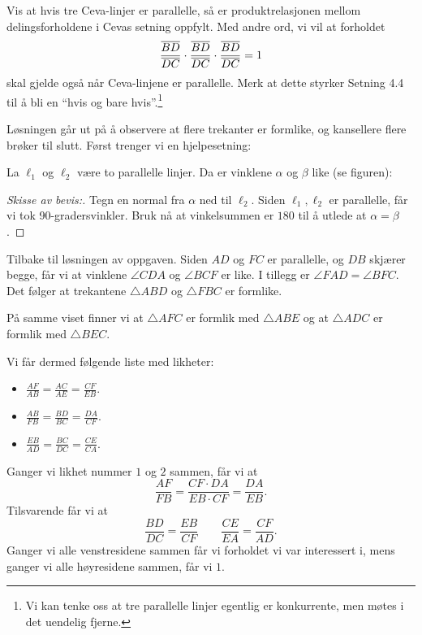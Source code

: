 \documentclass[11pt, norsk]{article}
\begin{document}
\begin{oppg}
 Vis at hvis tre Ceva-linjer er parallelle, så er produktrelasjonen mellom delingsforholdene i Cevas setning oppfylt. Med andre ord, vi vil at forholdet
$$
\frac{\overline{BD}}{\overline{DC}} \cdot
\frac{\overline{BD}}{\overline{DC}} \cdot
\frac{\overline{BD}}{\overline{DC}} = 1
$$
skal gjelde også når Ceva-linjene er parallelle. Merk at dette styrker Setning 4.4 til å bli en ``hvis og bare hvis''.\footnote{Vi kan tenke oss at tre parallelle linjer egentlig er konkurrente, men møtes i det uendelig fjerne.}
\end{oppg}
\begin{losn}

Løsningen går ut på å observere at flere trekanter er formlike, og kansellere flere brøker til slutt. Først trenger vi en hjelpesetning:

\begin{lemma}
  La $\ell_1$ og $\ell_2$ være to parallelle linjer. Da er vinklene $\alpha$ og $\beta$ like (se figuren):
\begin{center}
\end{center}
\end{lemma}
\begin{proof}[Skisse av bevis:]
Tegn en normal fra $\alpha$ ned til $\ell_2$. Siden $\ell_1,\ell_2$ er parallelle, får vi tok 90-gradersvinkler. Bruk nå at vinkelsummen er $180$ til å utlede at $\alpha=\beta$.
\end{proof}

Tilbake til løsningen av oppgaven. Siden $AD$ og $FC$ er parallelle, og $DB$ skjærer begge, får vi at vinklene $\angle CDA$ og $\angle BCF$ er like. I tillegg er $\angle FAD=\angle BFC$. Det følger at trekantene $\triangle ABD$ og $\triangle FBC$ er formlike.

På samme viset finner vi at $\triangle AFC$ er formlik med $\triangle ABE$ og at $\triangle ADC$ er formlik med $\triangle BEC$.

Vi får dermed følgende liste med likheter:
\begin{itemize}
\item $\frac{AF}{AB}=\frac{AC}{AE}=\frac{CF}{EB}$.
\item $\frac{AB}{FB}=\frac{BD}{BC}=\frac{DA}{CF}$.
\item $\frac{EB}{AD}=\frac{BC}{DC}=\frac{CE}{CA}$.
\end{itemize}
Ganger vi likhet nummer $1$ og $2$ sammen, får vi at
$$
\frac{AF}{FB} = \frac{CF \cdot DA}{EB \cdot CF} = \frac{DA}{EB}.
$$
Tilsvarende får vi at
$$
\frac{BD}{DC} = \frac{EB}{CF}  \qquad \frac{CE}{EA}=\frac{CF}{AD}.
$$
Ganger vi alle venstresidene sammen får vi forholdet vi var interessert i, mens ganger vi alle høyresidene sammen, får vi $1$. 


\end{losn}
\end{document}
